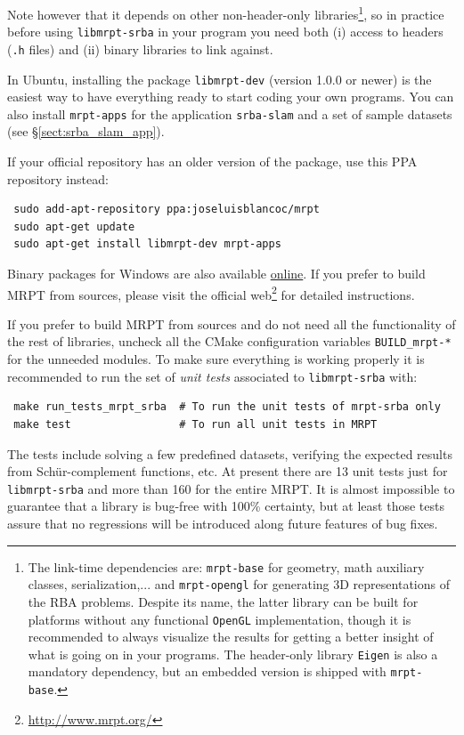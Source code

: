 \documentclass[a4paper,11pt]{article}
\begin{document}
Note however that it depends on other non-header-only libraries\footnote{The link-time dependencies are: \texttt{mrpt-base} 
for geometry, math auxiliary classes, serialization,... and \texttt{mrpt-opengl} for generating 3D representations of 
the RBA problems. Despite its name, the latter library can be built for platforms without any 
functional \texttt{OpenGL} implementation, though it is recommended to always visualize the results for getting a better 
insight of what is going on in your programs. The header-only library \texttt{Eigen} \cite{eigenweb} is also a mandatory dependency, but 
an embedded version is shipped with \texttt{mrpt-base}.}, 
so in practice before using \texttt{libmrpt-srba} in your program you need
both (i) access to headers (\texttt{.h} files) and (ii) binary libraries to link against. 

In Ubuntu, installing the package \texttt{libmrpt-dev} (version 1.0.0 or newer) is the easiest way to have 
everything ready to start coding your own programs. You can also install \texttt{mrpt-apps} for the application \texttt{srba-slam} 
and a set of sample datasets (see \S\ref{sect:srba_slam_app}).

If your official repository has an older version of the package, use this PPA repository instead:

\begin{lstlisting}
 sudo add-apt-repository ppa:joseluisblancoc/mrpt
 sudo apt-get update
 sudo apt-get install libmrpt-dev mrpt-apps
\end{lstlisting}

Binary packages for Windows are also available \href{http://www.mrpt.org/download}{online}.
If you prefer to build MRPT from sources, please visit the official web\footnote{\href{http://www.mrpt.org/}{http://www.mrpt.org/}} 
for detailed instructions.

If you prefer to build MRPT from sources and do not need all the functionality of the rest of libraries, 
uncheck all the CMake configuration variables \texttt{BUILD\_mrpt-*} for the unneeded modules. 
To make sure everything is working properly it is recommended to run the set of \emph{unit tests} associated 
to \texttt{libmrpt-srba} with: 

\begin{lstlisting}
 make run_tests_mrpt_srba  # To run the unit tests of mrpt-srba only
 make test                 # To run all unit tests in MRPT
\end{lstlisting}

The tests include solving a few predefined datasets, verifying the expected results from 
Sch\"ur-complement functions, etc. At present there are 13 unit tests just for \texttt{libmrpt-srba}
and more than 160 for the entire MRPT. 
It is almost impossible to guarantee that a library is bug-free with 100\% certainty, 
but at least those tests assure that no regressions will be introduced along future features of bug fixes.
\end{document}
